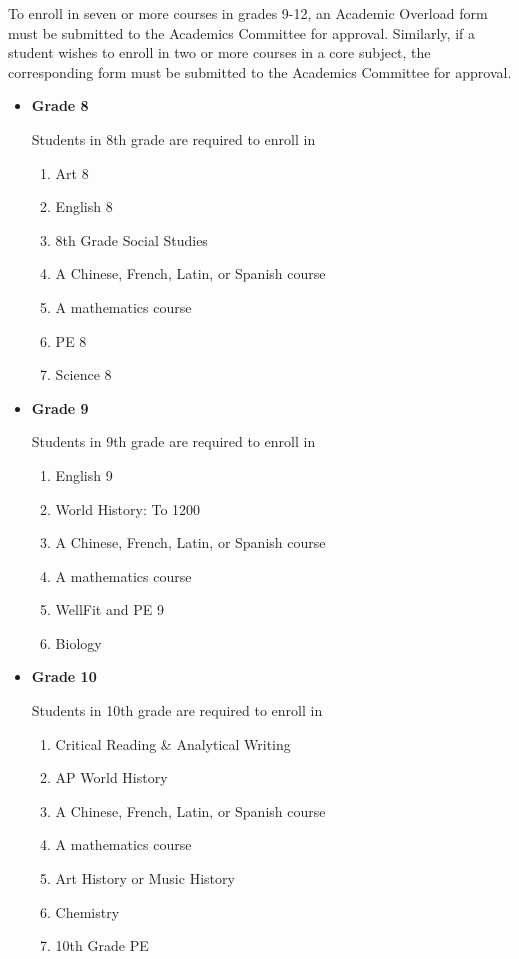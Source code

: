 To enroll in seven or more courses in grades 9-12, an Academic Overload form must be submitted to the Academics Committee for approval.  Similarly, if a student wishes to enroll in two or more courses in a core subject, the corresponding form must be submitted to the Academics Committee for approval. 

\begin{itemize}\itemsep=0mm
  \item[] \textbf{Grade 8}
  
  Students in 8th grade are required to enroll in 
\begin{enumerate}\itemsep=0mm
    \item Art 8
    \item English 8
    \item 8th Grade Social Studies
    \item A Chinese, French, Latin, or Spanish course 
    \item A mathematics course
    \item PE 8
    \item Science 8
  \end{enumerate}
  

  
  \item[] \textbf{Grade 9}
  
  Students in 9th grade are required to enroll in 
\begin{enumerate}\itemsep=0mm
    \item English 9
    \item World History:  To 1200
    \item A Chinese, French, Latin, or Spanish course 
    \item A mathematics course
    \item WellFit and PE 9
    \item Biology
  \end{enumerate}
  
  \item[] \textbf{Grade 10}
  
  Students in 10th grade are required to enroll in 
\begin{enumerate}\itemsep=0mm
    \item Critical Reading \& Analytical Writing
    \item AP World History 
    \item A Chinese, French, Latin, or Spanish course 
    \item A mathematics course
    \item Art History or Music History
    \item Chemistry
    \item 10th Grade PE
  \end{enumerate}
  

\end{itemize}
